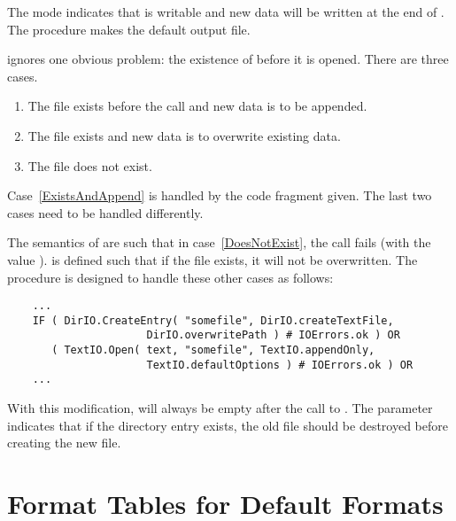 The mode  indicates that  is
writable and new data will be written at the end of .
The procedure  makes  the default
output file.  

 ignores one obvious problem:
the existence of  before it is opened.
There are three cases.
\begin{enumerate}
\item\label{ExistsAndAppend}
    The file exists before the call and new data is to be appended.
\item\label{ExistsAndDestroy}
    The file exists and new data is to overwrite existing data.
\item\label{DoesNotExist}
    The file does not exist.
\end{enumerate}

Case~\ref{ExistsAndAppend} is handled by the code fragment given.
The last two cases need to be handled differently.

The semantics of  are such that in
case~\ref{DoesNotExist}, the call fails (with the value
).  
 is defined such that if the
file exists, it will not be overwritten.  The procedure
 is designed to handle these other
cases as follows:

\begin{verbatim}
    ...
    IF ( DirIO.CreateEntry( "somefile", DirIO.createTextFile,
                      DirIO.overwritePath ) # IOErrors.ok ) OR
       ( TextIO.Open( text, "somefile", TextIO.appendOnly, 
                      TextIO.defaultOptions ) # IOErrors.ok ) OR
    ...
\end{verbatim}

With this modification,  will always be empty
after the call to .  The parameter 
 indicates that if the directory
entry  exists, the old file should be destroyed
before creating the new file.

\section{Format Tables for Default Formats}
\label{FormatTables}

